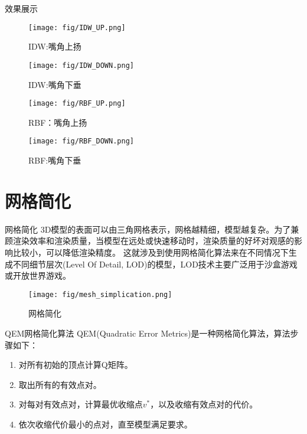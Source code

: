 \documentclass[10.5pt]{beamer}
\begin{document}
\begin{frame}{效果展示}

\begin{figure}[H]
\begin{minipage}{0.48\linewidth}
  \centerline{\texttt{[image: fig/IDW\_UP.png]}}
  \caption{IDW:嘴角上扬}
\end{minipage}
\hfill
\begin{minipage}{0.48\linewidth}
  \centerline{\texttt{[image: fig/IDW\_DOWN.png]}}
  \caption{IDW:嘴角下垂}
\end{minipage}
\vfill
\begin{minipage}{0.48\linewidth}
  \centerline{\texttt{[image: fig/RBF\_UP.png]}}
  \caption{RBF：嘴角上扬}
\end{minipage}
\hfill
\begin{minipage}{0.48\linewidth}
  \centerline{\texttt{[image: fig/RBF\_DOWN.png]}}
  \caption{RBF:嘴角下垂}
\end{minipage}
\end{figure}

\end{frame}

\section{网格简化}
\begin{frame}{网格简化}
3D模型的表面可以由三角网格表示，网格越精细，模型越复杂。为了兼顾渲染效率和渲染质量，当模型在远处或快速移动时，渲染质量的好坏对观感的影响比较小，可以降低渲染精度。
这就涉及到使用网格简化算法来在不同情况下生成不同细节层次(Level Of Detail, LOD)的模型，LOD技术主要广泛用于沙盒游戏或开放世界游戏。

\begin{figure}[!t]
\centering
\texttt{[image: fig/mesh\_simplication.png]}
\caption{网格简化}
\label{fig_4}
\end{figure}
\end{frame}


\begin{frame}{QEM网格简化算法}
QEM(Quadratic Error Metrics)是一种网格简化算法，算法步骤如下：
\begin{enumerate}
\item 对所有初始的顶点计算Q矩阵。
\item 取出所有的有效点对。
\item 对每对有效点对，计算最优收缩点$v^{*}$，以及收缩有效点对的代价。
\item 依次收缩代价最小的点对，直至模型满足要求。
\end{enumerate}
\end{frame}
\end{document}
